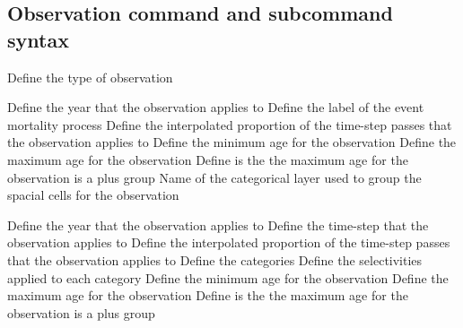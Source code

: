 \subsection{Observation command and subcommand syntax}\par
{}\par\par
{} {Define the type of observation}
\par\textbf{}\par
{} {Define the year that the observation applies to}
 {Define the label of the event mortality process}
 {Define the interpolated proportion of the time-step passes that the observation applies to}
 {Define the minimum age for the observation}
 {Define the maximum age for the observation}
 {Define is the the maximum age for the observation is a plus group}
 {Name of the categorical layer used to group the spacial cells for the observation}
\par\textbf{}\par
{} {Define the year that the observation applies to}
 {Define the time-step that the observation applies to}
 {Define the interpolated proportion of the time-step passes that the observation applies to}
 {Define the categories}
 {Define the selectivities applied to each category}
 {Define the minimum age for the observation}
 {Define the maximum age for the observation}
 {Define is the the maximum age for the observation is a plus group}
